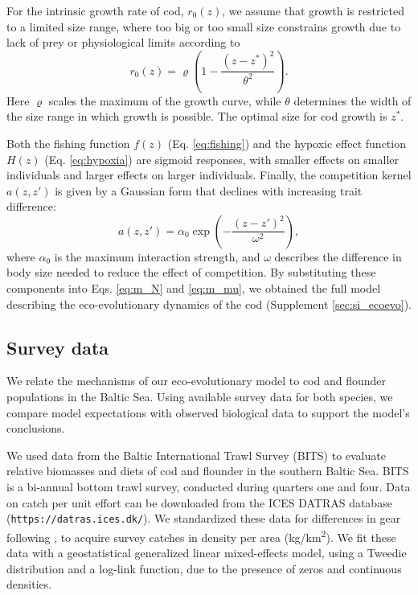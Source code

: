 \documentclass[9pt,twocolumn,twoside]{pnas-new}
\begin{document}
{For the intrinsic growth rate of cod, $r_{0}(z)$, we assume that growth is restricted to a limited size range, where too big or too small size constrains growth due to lack of prey or physiological limits according to
\begin{equation}
  \label{eq:m_r0}
  r_{0}(z) = \varrho \left( 1- \frac{(z-z^*)^2}{\theta^{2}} \right).
\end{equation}
Here $\varrho$ scales the maximum of the growth curve, while $\theta$ determines the width of the size range in which growth is possible. The optimal size for cod growth is $z^{*}$.

Both the fishing function $f(z)$ (Eq. \ref{eq:fishing}) and the hypoxic effect function $H(z)$ (Eq. \ref{eq:hypoxia}) are sigmoid responses, with smaller effects on smaller individuals and larger effects on larger individuals. Finally, the competition kernel $a(z,z')$ is given by a Gaussian form that declines with increasing trait difference:
\begin{equation}
    \label{eq:m_compkern}
    a(z,z') = \alpha_0 \exp\left(-\frac{(z-z')^2}{\omega^{2}} \right) ,
\end{equation}
where $\alpha_0$ is the maximum interaction strength, and $\omega$ describes the difference in body size needed to reduce the effect of competition. By substituting these components into Eqs. \ref{eq:m_N} and \ref{eq:m_mu}, we obtained the full model describing the eco-evolutionary dynamics of the cod (Supplement \ref{sec:si_ecoevo}). 


\subsection*{Survey data}

We relate the mechanisms of our eco-evolutionary model to cod and flounder populations in the Baltic Sea. Using available survey data for both species, we compare model expectations with observed biological data to support the model's conclusions. 

We used data from the Baltic International Trawl Survey (BITS) to evaluate relative biomasses and diets of cod and flounder in the southern Baltic Sea. BITS is a bi-annual bottom trawl survey, conducted during quarters one and four. Data on catch per unit effort can be downloaded from the ICES DATRAS database (\texttt{https://datras.ices.dk/}). We standardized these data for differences in gear following \citep{Orio2017, Lindmark2023}, to acquire survey catches in density per area (kg/km\textsuperscript{2}). We fit these data with a geostatistical generalized linear mixed-effects model, using a Tweedie distribution \citep{Tweedie1984, Shono2008, andersonSdmTMBPackageFast2022} and a log-link function, due to the presence of zeros and continuous densities. 

}
\end{document}
